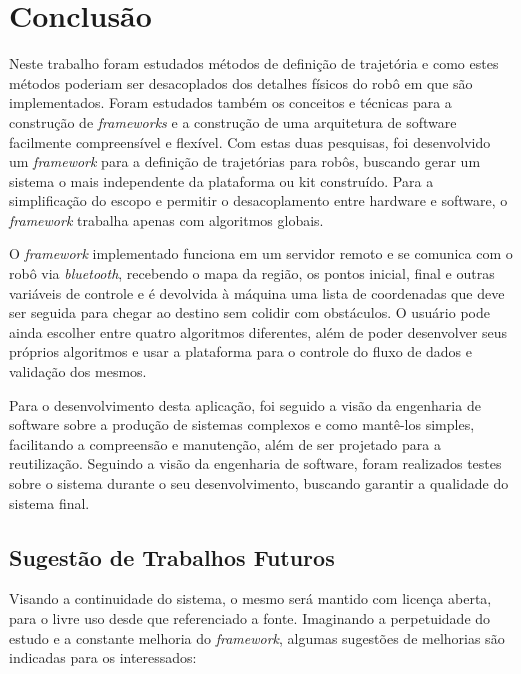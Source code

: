 \chapter[Conclusão]{Conclusão}

Neste trabalho foram estudados métodos de definição de trajetória e como estes métodos poderiam ser desacoplados dos detalhes físicos do robô em que são implementados. Foram estudados também os conceitos e técnicas para a construção de \textit{frameworks} e a construção de uma arquitetura de software facilmente compreensível e flexível. Com estas duas pesquisas, foi desenvolvido um \textit{framework} para a definição de trajetórias para robôs, buscando gerar um sistema o mais independente da plataforma ou kit construído. Para a simplificação do escopo e permitir o desacoplamento entre hardware e software, o \textit{framework} trabalha apenas com algoritmos globais.

O \textit{framework} implementado funciona em um servidor remoto e se comunica com o robô via \textit{bluetooth}, recebendo o mapa da região, os pontos inicial, final e outras variáveis de controle e é devolvida à máquina uma lista de coordenadas que deve ser seguida para chegar ao destino sem colidir com obstáculos. O usuário pode ainda escolher entre quatro algoritmos diferentes, além de poder desenvolver seus próprios algoritmos e usar a plataforma para o controle do fluxo de dados e validação dos mesmos.

Para o desenvolvimento desta aplicação, foi seguido a visão da engenharia de software sobre a produção de sistemas complexos e como mantê-los simples, facilitando a compreensão e manutenção, além de ser projetado para a reutilização. Seguindo a visão da engenharia de software, foram realizados testes sobre o sistema durante o seu desenvolvimento, buscando garantir a qualidade do sistema final.

\section{Sugestão de Trabalhos Futuros}

Visando a continuidade do sistema, o mesmo será mantido com licença aberta, para o livre uso desde que referenciado a fonte. Imaginando a perpetuidade do estudo e a constante melhoria do \textit{framework}, algumas sugestões de melhorias são indicadas para os interessados:

